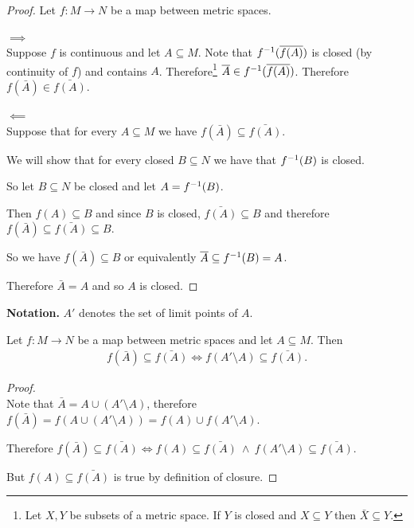 \documentclass[12pt]{article}
\begin{document}
\begin{proof}
  Let $f:M \to N$ be a map between metric spaces.

  $\implies$\\
  Suppose $f$ is continuous and let $A \subseteq M$. Note that $f^{-1}(\overline{f(A)})$ is closed (by
  continuity of $f$) and contains $A$. Therefore\footnote{Let $X, Y$ be subsets of a metric
    space. If $Y$ is closed and $X \subseteq Y$ then $\bar X \subseteq Y$.}
  $\overline A \in f^{-1}(\overline{f(A)})$. Therefore $f(\bar A) \in \bar{f(A)}$.

  $\impliedby$\\
  Suppose that for every $A \subseteq M$ we have $f(\bar A) \subseteq \bar{f(A)}$.

  We will show that for every closed $B \subseteq N$ we have that $f^{-1}(B)$ is closed.

  So let $B \subseteq N$ be closed and let $A = f^{-1}(B)$.

  Then $f(A) \subseteq B$ and since $B$ is closed, $\bar{f(A)} \subseteq B$ and therefore
  $f(\bar A) \subseteq \bar{f(A)} \subseteq B$.

  So we have $f(\bar A) \subseteq B$ or equivalently $\overline A \subseteq f^{-1}(B) = A$.

  Therefore $\bar A = A$ and so $A$ is closed.
\end{proof}

\newpage
{}

{\bf Notation.} $A'$ denotes the set of limit points of $A$.

\begin{lemma}\label{external-limit-points-suffice}
  Let $f:M \to N$ be a map between metric spaces and let $A \subseteq M$. Then
  \begin{align*}
    f(\bar A) \subseteq \bar{f(A)} \iff f(A' \setminus A) \subseteq \bar{f(A)}.
  \end{align*}
\end{lemma}
\begin{proof}~\\
  Note that $\bar A = A \cup (A' \setminus A)$, therefore
  $f(\bar A) = f(A \cup (A' \setminus A)) = f(A) \cup f(A' \setminus A)$.

  Therefore
  $f(\bar A) \subseteq \bar{f(A)} \iff f(A) \subseteq \bar{f(A)} ~\land~ f(A' \setminus A)
  \subseteq \bar{f(A)}$.

  But $f(A) \subseteq \bar{f(A)}$ is true by definition of closure.
\end{proof}
\end{document}
